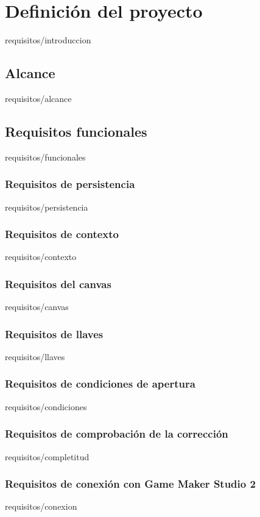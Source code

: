 \documentclass[epsbased,copyright,final,printable,covers,extendedindex,firstnumbered,tfg,gnuplot]{tfgtfmthesisuam}
\begin{document}
\chapter{Definición del proyecto\label{CAP:REQUISITOS}}{requisitos/introduccion}
	\section{Alcance\label{SEC:ALCANCE}}{requisitos/alcance}
	\section{Requisitos funcionales\label{SEC:REQUISITOSFUNCIONALES}}{requisitos/funcionales}
		\begin{functional}
		\subsection{Requisitos de persistencia\label{SUBSEC:REQPERSISTENCIA}}{requisitos/persistencia}
		\subsection{Requisitos de contexto\label{SUBSEC:REQCONTEXTO}}{requisitos/contexto}
		\subsection{Requisitos del canvas\label{SUBSEC:REQCANVAS}}{requisitos/canvas}
		\subsection{Requisitos de llaves\label{SUBSEC:REQLLAVES}}{requisitos/llaves}
		\subsection{Requisitos de condiciones de apertura\label{SUBSEC:REQCONDICIONES}}{requisitos/condiciones}
		\subsection{Requisitos de comprobación de la corrección\label{SUBSEC:REQCOMPLETITUD}}{requisitos/completitud}
		\subsection{Requisitos de conexión con Game Maker Studio 2\label{SUBSEC:REQCONEXION}}{requisitos/conexion}
		\end{functional}
\end{document}
